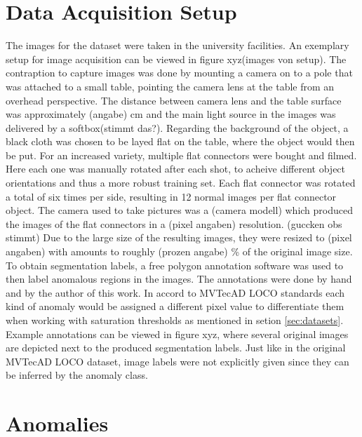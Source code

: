 



\section{Data Acquisition Setup}
\label{sec:faltconnectordataacquisiton}

The images for the dataset were taken in the university facilities. An exemplary setup for image acquisition can be viewed in figure xyz(images von setup). The contraption to capture images was 
done by mounting a camera on to a pole that was attached to a small table, pointing the camera lens at the table from an overhead perspective. The distance between camera lens and the table surface was approximately (angabe) cm and the main light source in the 
images was delivered by a softbox(stimmt das?). Regarding the background of the object, a black cloth was chosen to be layed flat on the table, where the object would then be put. For 
an increased variety, multiple flat connectors were bought and filmed. Here each one was manually rotated after each shot, to acheive different object orientations and thus a more robust training 
set. Each flat connector was rotated a total of six times per side, resulting in 12 normal images per flat connector object. \newline
The camera used to take pictures was a (camera modell) which produced the images of the flat connectors in a (pixel angaben) resolution. (guccken obs stimmt) Due to the large size of the resulting 
images, they were resized to (pixel angaben) with amounts to roughly (prozen angabe) \% of the original image size.\newline
To obtain segmentation labels, a free polygon annotation software was used to then label anomalous regions in the images. The annotations were done by hand and by the author of this work. In accord to 
MVTecAD LOCO standards \cite{LOCODentsAndScratchesBergmann2022} each kind of anomaly would be assigned a different pixel value to differentiate them when working with saturation thresholds 
as mentioned in setion \ref{sec:datasets}. Example annotations can be viewed in figure xyz, where several original images are depicted next to the produced segmentation labels. Just like in the 
original MVTecAD LOCO dataset, image labels were not explicitly given since they can be inferred by the anomaly class.


\section{Anomalies}
\label{sec:flatconnectoranomalies}

